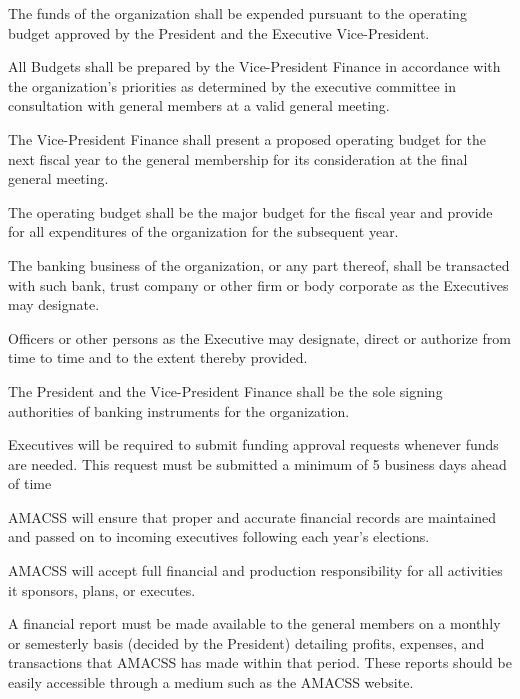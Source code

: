 \documentclass[12pt,a4paper]{article}
\begin{document}
\begin{constitutionlist}
\item The funds of the organization shall be expended pursuant to the operating budget approved by the President and the Executive Vice-President.

\item All Budgets shall be prepared by the Vice-President Finance in accordance with the organization's priorities as determined by the executive committee in consultation with general members at a valid general meeting.

\item The Vice-President Finance shall present a proposed operating budget for the next fiscal year to the general membership for its consideration at the final general meeting.

\item The operating budget shall be the major budget for the fiscal year and provide for all expenditures of the organization for the subsequent year.

\item The banking business of the organization, or any part thereof, shall be transacted with such bank, trust company or other firm or body corporate as the Executives may designate.

\item Officers or other persons as the Executive may designate, direct or authorize from time to time and to the extent thereby provided.

\item The President and the Vice-President Finance shall be the sole signing authorities of banking instruments for the organization.

\begin{constitutionlist}
\item Executives will be required to submit funding approval requests whenever funds are needed. This request must be submitted a minimum of 5 business days ahead of time
\end{constitutionlist}

\item AMACSS will ensure that proper and accurate financial records are maintained and passed on to incoming executives following each year's elections.

\item AMACSS will accept full financial and production responsibility for all activities it sponsors, plans, or executes.

\item A financial report must be made available to the general members on a monthly or semesterly basis (decided by the President) detailing profits, expenses, and transactions that AMACSS has made within that period. These reports should be easily accessible through a medium such as the AMACSS website.
\end{constitutionlist}
\end{document}
